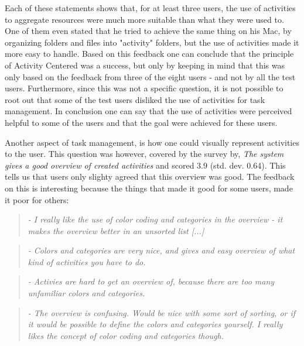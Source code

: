 Each of these statements shows that, for at least three users, the use of activities to aggregate resources were much more suitable than what they were used to. One of them even stated that he tried to achieve the same thing on his Mac, by organizing folders and files into "activity" folders, but the use of activities made it more easy to handle. Based on this feedback one can conclude that the principle of Activity Centered was a success, but only by keeping in mind that this was only based on the feedback from three of the eight users - and not by all the test users. Furthermore, since this was not a specific question, it is not possible to root out that some of the test users disliked the use of activities for task management. In conclusion one can say that the use of activities were perceived helpful to some of the users and that the goal were achieved for these users.

Another aspect of task management, is how one could visually represent activities to the user. This question was however, covered by the survey by, \emph{The system gives a good overview of created activities} and scored 3.9 (std. dev. 0.64). This tells us that users only slighty agreed that this overview was good. The feedback on this is interesting because the things that made it good for some users, made it poor for others:

\begin{quotation}
	\emph{
		- I really like the use of color coding and categories in the overview - it makes the overview better in an unsorted list [...]
	}
\end{quotation}

\begin{quotation}
	\emph{
		- Colors and categories are very nice, and gives and easy overview of what kind of activities you have to do.
	}
\end{quotation}

\begin{quotation}
	\emph{
		- Activies are hard to get an overview of, because there are too many unfamiliar colors and categories.
	}
\end{quotation}

\begin{quotation}
	\emph{
		- The overview is confusing. Would be nice with some sort of sorting, or if it would be possible to define the colors and categories yourself. I really likes the concept of color coding and categories though.
	}
\end{quotation}

